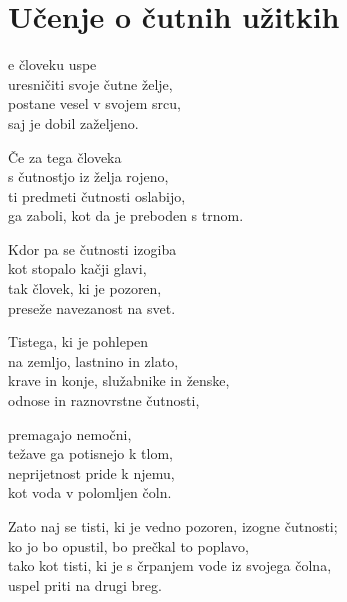 \cleartorecto
{}
\chapter{Učenje o čutnih užitkih}

e človeku uspe\\
uresničiti svoje čutne želje,\\
postane vesel v svojem srcu,\\
saj je dobil zaželjeno.

Če za tega človeka\\
s čutnostjo iz želja rojeno,\\
ti predmeti čutnosti oslabijo,\\
ga zaboli, kot da je preboden s trnom.

Kdor pa se čutnosti izogiba\\
kot stopalo kačji glavi,\\
tak človek, ki je pozoren,\\
preseže navezanost na svet.

Tistega, ki je pohlepen\\
na zemljo, lastnino in zlato,\\
krave in konje, služabnike in ženske,\\
odnose in raznovrstne čutnosti,

\clearpage

premagajo nemočni,\\
težave ga potisnejo k tlom,\\
neprijetnost pride k njemu,\\
kot voda v polomljen čoln.

Zato naj se tisti, ki je vedno pozoren, izogne čutnosti;\\
ko jo bo opustil, bo prečkal to poplavo,\\
tako kot tisti, ki je s črpanjem vode iz svojega čolna,\\
uspel priti na drugi breg.


